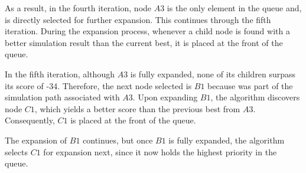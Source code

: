As a result, in the fourth iteration, node \(A3\) is the only element in the queue and, is directly selected for further expansion. This continues through the fifth iteration. During the expansion process, whenever a child node is found with a better simulation result than the current best, it is placed at the front of the queue. 

In the fifth iteration, although \(A3\) is fully expanded, none of its children surpass its score of -34. Therefore, the next node selected is \(B1\) because was part of the simulation path associated with \(A3\). Upon expanding \(B1\), the algorithm discovers node \(C1\), which yields a better score than the previous best from \(A3\). Consequently, \(C1\) is placed at the front of the queue.  

The expansion of \(B1\) continues, but once \(B1\) is fully expanded, the algorithm selects \(C1\) for expansion next, since it now holds the highest priority in the queue.
